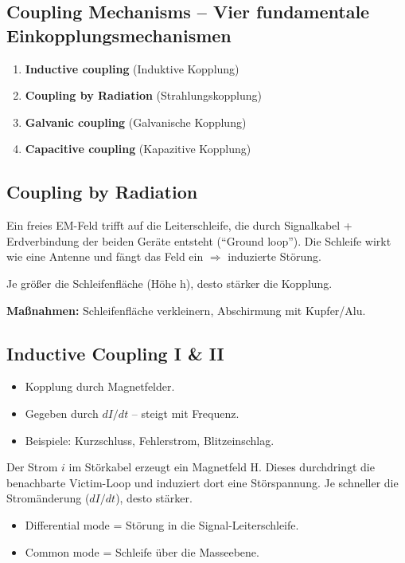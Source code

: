 \documentclass[11pt,a4paper]{article}
\begin{document}
\subsection{Coupling Mechanisms -- Vier fundamentale Einkopplungsmechanismen}
\begin{enumerate}
    \item \textbf{Inductive coupling} (Induktive Kopplung)
    \item \textbf{Coupling by Radiation} (Strahlungskopplung)
    \item \textbf{Galvanic coupling} (Galvanische Kopplung)
    \item \textbf{Capacitive coupling} (Kapazitive Kopplung)
\end{enumerate}

\subsection{Coupling by Radiation}
Ein freies EM-Feld trifft auf die Leiterschleife, die durch Signalkabel + Erdverbindung der beiden Geräte entsteht (``Ground loop''). Die Schleife wirkt wie eine Antenne und fängt das Feld ein $\Rightarrow$ induzierte Störung.

Je größer die Schleifenfläche (Höhe h), desto stärker die Kopplung.

\textbf{Maßnahmen:} Schleifenfläche verkleinern, Abschirmung mit Kupfer/Alu.

\subsection{Inductive Coupling I \& II}
\begin{itemize}
    \item Kopplung durch Magnetfelder.
    \item Gegeben durch $dI/dt$ -- steigt mit Frequenz.
    \item Beispiele: Kurzschluss, Fehlerstrom, Blitzeinschlag.
\end{itemize}

Der Strom $i$ im Störkabel erzeugt ein Magnetfeld H. Dieses durchdringt die benachbarte Victim-Loop und induziert dort eine Störspannung. Je schneller die Stromänderung ($dI/dt$), desto stärker.

\begin{itemize}
    \item Differential mode = Störung in die Signal-Leiterschleife.
    \item Common mode = Schleife über die Masseebene.
\end{itemize}
\end{document}
